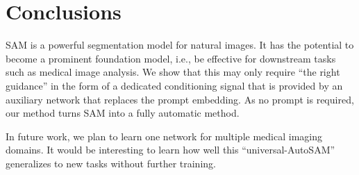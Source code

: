 \documentclass[runningheads]{llncs}
\begin{document}
\section{Conclusions}

SAM is a powerful segmentation model for natural images. It has the potential to become a prominent foundation model, i.e., be effective for downstream tasks such as medical image analysis. We show that this may only require ``the right guidance'' in the form of a dedicated conditioning signal that is provided by an auxiliary network  that replaces the prompt embedding. As no prompt is required, our method turns SAM into a fully automatic method.

In future work, we plan to learn one  network for multiple medical imaging domains. It would be interesting to learn how well this ``universal-AutoSAM'' generalizes to new tasks without further training.



\end{document}
